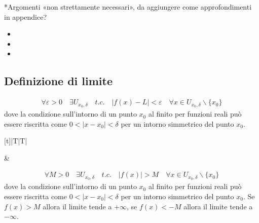\documentclass[letterpaper,10pt,italian]{jupyterBook}
\begin{document}
\sphinxAtStartPar
{} *Argomenti «non strettamente necessari», da aggiungere come approfondimenti in appendice?
\begin{itemize}
\item {} 
\sphinxAtStartPar
{}

\item {} 
\sphinxAtStartPar
{}

\item {} 
\sphinxAtStartPar
{}

\end{itemize}


\subsection{Definizione di limite}
\label{\detokenize{ch/infinitesimal_calculus/analysis:definizione-di-limite}}\label{\detokenize{ch/infinitesimal_calculus/analysis:infinitesimal-calculus-limits-def}}


\sphinxAtStartPar
{}
\begin{equation*}
\begin{split}\forall \varepsilon > 0 \quad \exists U_{x_0,\delta} \quad {t.c.} \quad |f(x) - L| < \varepsilon \quad \forall x \in U_{x_0, \delta} \backslash \{x_0\}\end{split}
\end{equation*}
\sphinxAtStartPar
dove la condizione sull’intorno di un punto \(x_0\) al finito per funzioni reali può essere riscritta come \(0 < | x - x_0 | <  \delta\) per un intorno simmetrico del punto \(x_0\).


\begin{savenotes}\sphinxattablestart
\centering
\begin{tabulary}{\linewidth}[t]{|T|T|}
\hline

\sphinxAtStartPar
{}
&
\sphinxAtStartPar
{}
\\
\hline
\end{tabulary}
\par
\sphinxattableend\end{savenotes}

\sphinxAtStartPar
{}
\begin{equation*}
\begin{split}\forall M > 0 \quad \exists U_{x_0,\delta} \quad {t.c.} \quad |f(x)| > M \quad \forall x \in U_{x_0, \delta} \backslash \{x_0\}\end{split}
\end{equation*}
\sphinxAtStartPar
dove la condizione sull’intorno di un punto \(x_0\) al finito per funzioni reali può essere riscritta come \(0 < | x - x_0 | <  \delta\) per un intorno simmetrico del punto \(x_0\). Se \(f(x) > M\) allora il limite tende a \(+\infty\), se \(f(x) < -M\) allora il limite tende a \(-\infty\).
\end{document}
